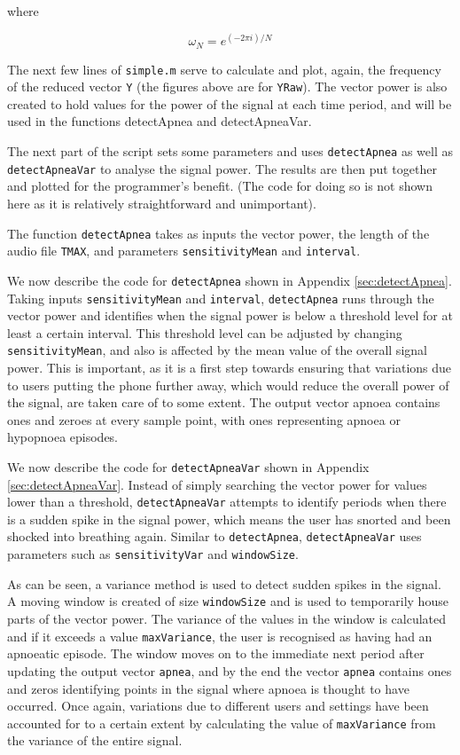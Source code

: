 where

\begin{equation}
\omega_N = e^{(-2\pi i )/N}
\end{equation}

The next few lines of \verb!simple.m! serve to calculate and plot, again, the frequency of the reduced vector \verb!Y! (the figures above are for \verb!YRaw!). The vector power is also created to hold values for the power of the signal at each time period, and will be used in the functions detectApnea and detectApneaVar.

The next part of the script sets some parameters and uses \verb!detectApnea! as well as \verb!detectApneaVar! to analyse the signal power. The results are then put together and plotted for the programmer's benefit. (The code for doing so is not shown here as it is relatively straightforward and unimportant).

The function \verb!detectApnea! takes as inputs the vector power, the length of the audio file \verb!TMAX!, and parameters \verb!sensitivityMean! and \verb!interval!.

We now describe the code for \verb!detectApnea! shown in Appendix \ref{sec:detectApnea}. Taking inputs \verb!sensitivityMean! and \verb!interval!, \verb!detectApnea! runs through the vector power and identifies when the signal power is below a threshold level for at least a certain interval. This threshold level can be adjusted by changing \verb!sensitivityMean!, and also is affected by the mean value of the overall signal power. This is important, as it is a first step towards ensuring that variations due to users putting the phone further away, which would reduce the overall power of the signal, are taken care of to some extent. The output vector apnoea contains ones and zeroes at every sample point, with ones representing apnoea or hypopnoea episodes.

We now describe the code for \verb!detectApneaVar! shown in Appendix \ref{sec:detectApneaVar}. Instead of simply searching the vector power for values lower than a threshold, \verb!detectApneaVar! attempts to identify periods when there is a sudden spike in the signal power, which means the user has snorted and been shocked into breathing again. Similar to \verb!detectApnea!, \verb!detectApneaVar! uses parameters such as \verb!sensitivityVar! and \verb!windowSize!.

As can be seen, a variance method is used to detect sudden spikes in the signal. A moving window is created of size \verb!windowSize! and is used to temporarily house parts of the vector power. The variance of the values in the window is calculated and if it exceeds a value \verb!maxVariance!, the user is recognised as having had an apnoeatic episode. The window moves on to the immediate next period after updating the output vector \verb!apnea!, and by the end the vector \verb!apnea! contains ones and zeros identifying points in the signal where apnoea is thought to have occurred. Once again, variations due to different users and settings have been accounted for to a certain extent by calculating the value of \verb!maxVariance! from the variance of the entire signal.

